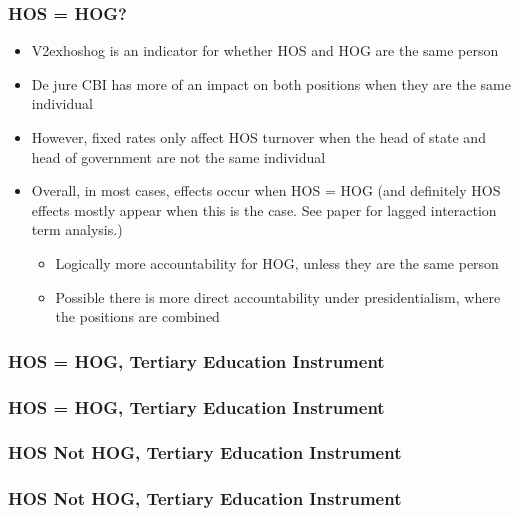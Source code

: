 \documentclass{beamer}
\begin{document}
    \begin{frame}
        \frametitle{HOS = HOG?}
        \begin{itemize}
            \item V2exhoshog is an indicator for whether HOS and HOG are the same person
            \item De jure CBI has more of an impact on both positions when they are the same individual
            \item However, fixed rates only affect HOS turnover when the head of state and head of government are not the same individual
            \item Overall, in most cases, effects occur when HOS = HOG (and definitely HOS effects mostly appear when this is the case. See paper for lagged interaction term analysis.)
            \begin{itemize}
                \item Logically more accountability for HOG, unless they are the same person
                \item Possible there is more direct accountability under presidentialism, where the positions are combined
            \end{itemize}
        \end{itemize}
    \end{frame}

    \begin{frame}
        \frametitle{HOS = HOG, Tertiary Education Instrument}
        {
            \let\oldcentering\centering
            \renewcommand\centering{\tiny\oldcentering}
            
        }
    \end{frame}

    \begin{frame}
        \frametitle{HOS = HOG, Tertiary Education Instrument}
        {
            \let\oldcentering\centering
            \renewcommand\centering{\tiny\oldcentering}
            
        }
    \end{frame}

    \begin{frame}
        \frametitle{HOS Not HOG, Tertiary Education Instrument}
        {
            \let\oldcentering\centering
            \renewcommand\centering{\tiny\oldcentering}
            
        }
    \end{frame}

    \begin{frame}
        \frametitle{HOS Not HOG, Tertiary Education Instrument}
        {
            \let\oldcentering\centering
            \renewcommand\centering{\tiny\oldcentering}
            
        }
    \end{frame}
\end{document}

